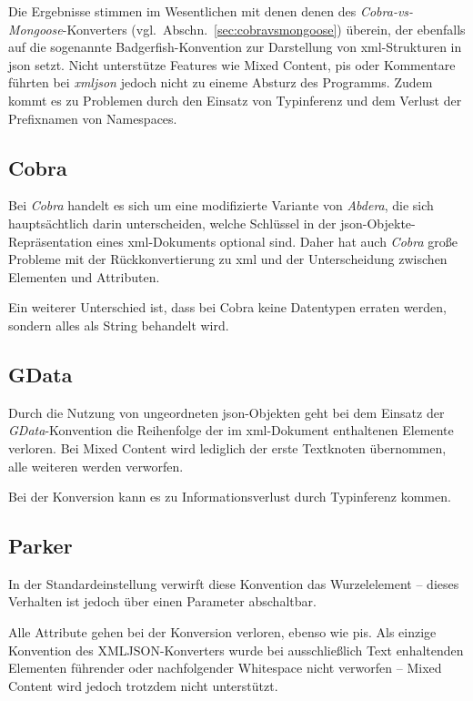 Die Ergebnisse stimmen im Wesentlichen mit denen  denen des \emph{Cobra-vs-Mongoose}-Konverters (vgl.~Abschn.~\ref{sec:cobravsmongoose}) überein, der ebenfalls auf die sogenannte Badgerfish-Konvention zur Darstellung von \acrshort{xml}-Strukturen in \acrshort{json} setzt. Nicht unterstütze Features wie Mixed Content, \glspl{pi} oder Kommentare führten bei \emph{xmljson} jedoch nicht zu eineme Absturz des Programms. Zudem kommt es zu Problemen durch den Einsatz von Typinferenz und dem Verlust der Prefixnamen von Namespaces.

\subsection{Cobra}
\label{sec:xmljson-cobra}

Bei \emph{Cobra} handelt es sich um eine modifizierte Variante von \emph{Abdera}, die sich hauptsächtlich darin unterscheiden, welche Schlüssel in der \acrshort{json}-Objekte-Repräsentation eines \acrshort{xml}-Dokuments optional sind. Daher hat auch \emph{Cobra} große Probleme mit der Rückkonvertierung zu \acrshort{xml} und der Unterscheidung zwischen Elementen und Attributen.

Ein weiterer Unterschied ist, dass bei Cobra keine Datentypen erraten werden, sondern alles als String behandelt wird.

\subsection{GData}
\label{sec:xmljson-gdata}

Durch die Nutzung von ungeordneten \acrshort{json}-Objekten geht bei dem Einsatz der \emph{GData}-Konvention die Reihenfolge der im \acrshort{xml}-Dokument enthaltenen Elemente verloren. Bei Mixed Content wird lediglich der erste Textknoten übernommen, alle weiteren werden verworfen.

Bei der Konversion kann es zu Informationsverlust durch Typinferenz kommen.

\subsection{Parker}
\label{sec:xmljson-parker}

In der Standardeinstellung verwirft diese Konvention das Wurzelelement -- dieses Verhalten ist jedoch über einen Parameter abschaltbar.

Alle Attribute gehen bei der Konversion verloren, ebenso wie \glspl{pi}. Als einzige Konvention des XMLJSON-Konverters wurde bei ausschließlich Text enhaltenden Elementen führender oder nachfolgender Whitespace nicht verworfen -- Mixed Content wird jedoch trotzdem nicht unterstützt.

